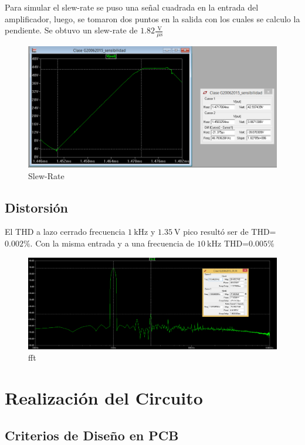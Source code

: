 \documentclass[a4paper,12pt,twoside]{article}
\newcommand{\volt}{\ensuremath{~\mathrm{V}}}
\newcommand{\kHz}{\ensuremath{~\mathrm{kHz}}}
\newcommand{\uS}{\ensuremath{~\mu\mathrm{s}}}
\begin{document}
Para simular el slew-rate se puso una señal cuadrada en la entrada del amplificador, luego, se tomaron dos puntos en la salida con los cuales se calculo la pendiente.
Se obtuvo un slew-rate de $1.82 \frac{\volt}{\uS}$

\begin{figure}[H]
\centering
\includegraphics[scale=0.6]{img/slew_rate}
\caption{Slew-Rate}
\label{slew} 
\end{figure}



\subsection{Distorsión}

El THD a lazo cerrado frecuencia $1 \kHz$ y $1.35 \volt$ pico resultó ser de  THD=$0.002\%$.
Con la misma entrada y a una frecuencia de $10 \kHz$ THD=$0.005\%$


\begin{figure}[H]
\centering
\includegraphics[scale=0.5]{img/fft}
\caption{fft}
\label{fft} 
\end{figure}



\newpage
\section{Realización del Circuito}
\subsection{Criterios de Diseño en PCB}
\end{document}
